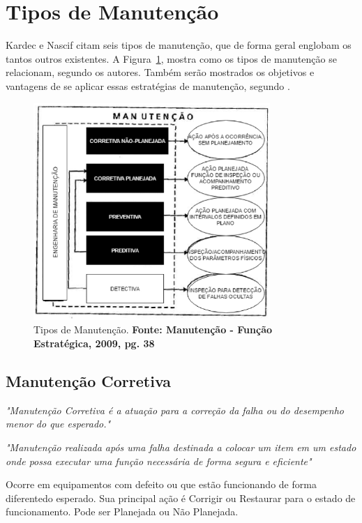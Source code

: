\section{Tipos de Manutenção}
\label{tipos-man}


Kardec e Nascif citam seis tipos de manutenção, que de forma geral englobam os tantos outros existentes. A Figura~\ref{tiposmanutencao}, mostra como os tipos de manutenção se relacionam, segundo os autores. 
Também serão mostrados os objetivos e vantagens de se aplicar essas estratégias de manutenção, segundo \cite{pereira2011engenharia}.

\graphicspath{{figuras/}}
\begin{figure}[H]
\centering
\includegraphics[width=0.8\textwidth]{tipos-de-manutencao}
\caption{Tipos de Manutenção. \textbf{Fonte: Manutenção - Função Estratégica, 2009, pg. 38\hfill}}
\label{tiposmanutencao}
\end{figure}


\subsection{Manutenção Corretiva}

		\emph{"Manutenção Corretiva é a atuação para a correção da falha ou do desempenho menor do que esperado."} \cite{kardecnascif2010}

		\emph{"Manutenção realizada após uma falha destinada a colocar um item em um estado onde possa executar uma função necessária de forma segura e eficiente"} \cite{british1993bs}

		Ocorre em equipamentos com defeito ou que estão funcionando de forma diferentedo esperado. Sua principal ação é Corrigir ou Restaurar para o estado de funcionamento. Pode ser Planejada ou Não Planejada.


